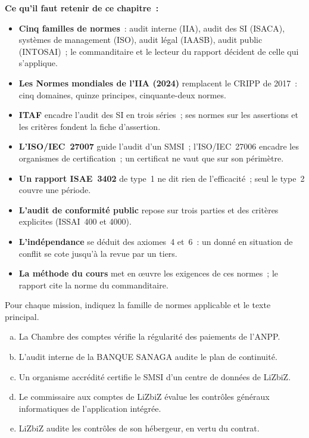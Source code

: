 
\separateur

\begin{boxresume}
\textbf{Ce qu'il faut retenir de ce chapitre~:}
\begin{itemize}
    \item \textbf{Cinq familles de normes}~: audit interne (IIA), audit des
          SI (ISACA), systèmes de management (ISO), audit légal (IAASB),
          audit public (INTOSAI)~; le commanditaire et le lecteur du
          rapport décident de celle qui s'applique.
    \item \textbf{Les Normes mondiales de l'IIA (2024)} remplacent le CRIPP
          de 2017~: cinq domaines, quinze principes, cinquante-deux normes.
    \item \textbf{ITAF} encadre l'audit des SI en trois séries~; ses normes
          sur les assertions et les critères fondent la fiche d'assertion.
    \item \textbf{L'ISO/IEC~27007} guide l'audit d'un SMSI~; l'ISO/IEC~27006
          encadre les organismes de certification~; un certificat ne vaut
          que sur son périmètre.
    \item \textbf{Un rapport ISAE~3402} de type~1 ne dit rien de
          l'efficacité~; seul le type~2 couvre une période.
    \item \textbf{L'audit de conformité public} repose sur trois parties et
          des critères explicites (ISSAI~400 et 4000).
    \item \textbf{L'indépendance} se déduit des axiomes~4 et~6~: un \OUI{}
          donné en situation de conflit se cote \NEK{} jusqu'à la revue par
          un tiers.
    \item \textbf{La méthode du cours} met en œuvre les exigences de ces
          normes~; le rapport cite la norme du commanditaire.
\end{itemize}
\end{boxresume}

\bigskip

\begin{boxexo}[title={\ding{45}\quad Exercice~13.1. Quelle norme~? \niveaubase}]
Pour chaque mission, indiquez la famille de normes applicable et le texte
principal.
\begin{enumerate}[(a)]
    \item La Chambre des comptes vérifie la régularité des paiements de
          l'ANPP.
    \item L'audit interne de la BANQUE SANAGA audite le plan de continuité.
    \item Un organisme accrédité certifie le SMSI d'un centre de données de
          LiZbiZ.
    \item Le commissaire aux comptes de LiZbiZ évalue les contrôles généraux
          informatiques de l'application intégrée.
    \item LiZbiZ audite les contrôles de son hébergeur, en vertu du contrat.
\end{enumerate}
\end{boxexo}

